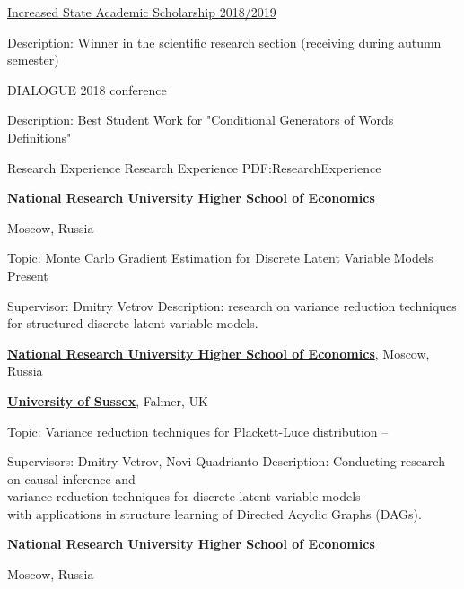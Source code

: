 \documentclass[letterpaper,MMMyyyy,nonstopmode]{simpleresumecv}
\begin{document}
\begin{Body}
\BulletItem
\href{https://www.hse.ru/en/scholarships/academic_raised_demo}{Increased State Academic Scholarship 2018/2019}
\begin{Detail}
\Item
Description: Winner in the scientific research section (receiving during autumn semester)
\end{Detail}

\BulletItem
DIALOGUE 2018 conference
\begin{Detail}
\Item
Description: Best Student Work for "Conditional Generators of Words Definitions"
\end{Detail}



\Section
{Research Experience}
{Research Experience}
{PDF:ResearchExperience}

\Entry
\href{https://www.hse.ru/en/}
{\textbf{National Research University Higher School of Economics}}
\par
Moscow, Russia

\BulletItem
Topic: Monte Carlo Gradient Estimation for Discrete Latent Variable Models
\hfill
Present
\begin{Detail}
\SubBulletItem
Supervisor:
Dmitry Vetrov
\SubBulletItem
Description: research on variance reduction techniques
\newline
for structured discrete latent variable models.
\end{Detail}

\newpage

\Entry
\href{https://www.hse.ru/en/}
{\textbf{National Research University Higher School of Economics}}, Moscow, Russia
\par
\href{https://www.sussex.ac.uk}
{\textbf{University of Sussex}}, Falmer, UK

\BulletItem
Topic: Variance reduction techniques for Plackett-Luce distribution
\hfill
{} --
\begin{Detail}
\SubBulletItem
Supervisors:
Dmitry Vetrov, Novi Quadrianto
\SubBulletItem
Description:
Conducting research on causal inference and\\ variance reduction techniques for discrete latent variable models\\ with applications in structure learning of Directed Acyclic Graphs (DAGs).
\end{Detail}

\Entry
\href{https://www.hse.ru/en/}
{\textbf{National Research University Higher School of Economics}}
\par
Moscow, Russia


\end{Body}
\end{document}
